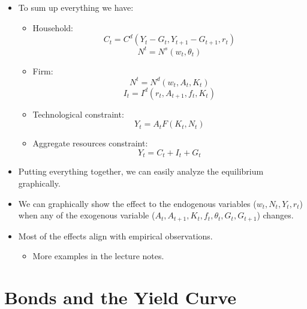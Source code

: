 \documentclass[notitlepage]{article}
\begin{document}
\begin{itemize}
\item To sum up everything we have:
\begin{itemize}
\item Household:
\[
C_t = C^d(Y_t-G_t, Y_{t+1}-G_{t+1}, r_t)
\]
\[
N^t = N^s(w_t, \theta_t)
\]
\item Firm:
\[
N^t = N^d(w_t, A_t, K_t)
\]
\[
I_t = I^d(r_t, A_{t+1}, f_t, K_t)
\]
\item Technological constraint:
\[
Y_t = A_tF(K_t, N_t)
\]
\item Aggregate resources constraint:
\[
Y_t = C_t + I_t + G_t
\]
\end{itemize}
\item Putting everything together, we can easily analyze the equilibrium graphically.
\end{itemize}

\newpage
\begin{figure}[h]
    \centering
    \resizebox{0.95\textwidth}{!}{
    
    }
\end{figure}

\begin{itemize}
\item We can graphically show the effect to the endogenous variables ($w_t, N_t, Y_t, r_t$) when any of the exogenous variable ($A_t, A_{t+1}, K_t, f_t, \theta_t, G_t, G_{t+1}$) changes.
\item Most of the effects align with empirical observations.
\begin{itemize}
\item More examples in the lecture notes.
\end{itemize}
\end{itemize}

\section{Bonds and the Yield Curve}
\end{document}
